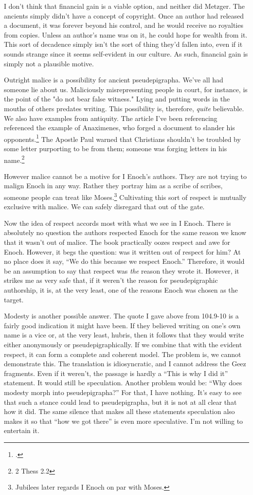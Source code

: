 \documentclass{article}
\begin{document}
I don't think that financial gain is a viable option, and neither did Metzger.
The ancients simply didn't have a concept of copyright.
Once an author had released a document, it was forever beyond his control, and he would receive no royalties from copies.
Unless an author's name was on it, he could hope for wealth from it.
This sort of decadence simply isn't the sort of thing they'd fallen into, even if it sounds strange since it seems self-evident in our culture.
As such, financial gain is simply not a plausible motive.

Outright malice is a possibility for ancient pseudepigrapha.
We've all had someone lie about us.
Maliciously misrepresenting people in court, for instance, is the point of the "do not bear false witness."
Lying and putting words in the mouths of others predates writing.
This possibility is, therefore, \emph{quite} believable.
We also have examples from antiquity.
The article I've been referencing referenced the example of Anaximenes, who forged a document to slander his opponents.\footcite[6]{BMetzger1972}
The Apostle Paul warned that Christians shouldn't be troubled by some letter purporting to be from them; someone was forging letters in his name.\footnote{2 Thess 2.2}

However malice cannot be a motive for I Enoch's authors.
They are not trying to malign Enoch in any way.
Rather they portray him as a scribe of scribes, someone people can treat like Moses.\footnote{Jubilees later regards I Enoch on par with Moses.}
Cultivating this sort of respect is mutually exclusive with malice.
We can safely disregard that out of the gate.

Now the idea of respect accords most with what we see in I Enoch.
There is absolutely no question the authors respected Enoch for the same reason we know that it wasn't out of malice.
The book practically oozes respect and awe for Enoch.
However, it begs the question: was it written out of respect for him?
At no place does it say, ``We do this because we respect Enoch.''
Therefore, it would be an assumption to say that respect was \emph{the} reason they wrote it.
However, it strikes me as very safe that, if it weren't the reason for pseudepigraphic authorship, it is, at the very least, one of the reasons Enoch was chosen as the target.

Modesty is another possible answer.
The quote I gave above from 104.9-10 is a fairly good indication it might have been.
If they believed writing on one's own name is a vice or, at the very least, hubris, then it follows that they would write either anonymously or pseudepigraphically.
If we combine that with the evident respect, it can form a complete and coherent model.
The problem is, we cannot demonstrate this.
The translation is idiosyncratic, and I cannot address the Geez fragments.
Even if it weren't, the passage is hardly a ``This is why I did it'' statement.
It would still be speculation.
Another problem would be: ``Why does modesty morph into pseudepigrapha?''
For that, I have nothing.
It's easy to see that such a stance could lead to pseudepigrapha, but it is not at all clear that how it did.
The same silence that makes all these statements speculation also makes it so that ``how we got there'' is even more speculative.
I'm not willing to entertain it.
\end{document}
